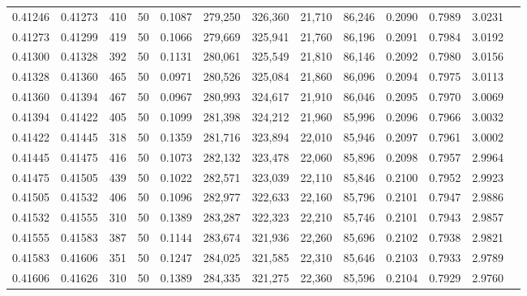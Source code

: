 \begin{tabular}{rrrrrrrrrrrrr}
0.41246 & 0.41273 &   410 &  50 &                                     0.1087 & 279,250 & 326,360 &  21,710 &  86,246 & 0.2090 & 0.7989 & 3.0231 \\
0.41273 & 0.41299 &   419 &  50 &                                     0.1066 & 279,669 & 325,941 &  21,760 &  86,196 & 0.2091 & 0.7984 & 3.0192 \\
0.41300 & 0.41328 &   392 &  50 &                                     0.1131 & 280,061 & 325,549 &  21,810 &  86,146 & 0.2092 & 0.7980 & 3.0156 \\
0.41328 & 0.41360 &   465 &  50 &                                     0.0971 & 280,526 & 325,084 &  21,860 &  86,096 & 0.2094 & 0.7975 & 3.0113 \\
0.41360 & 0.41394 &   467 &  50 &                                     0.0967 & 280,993 & 324,617 &  21,910 &  86,046 & 0.2095 & 0.7970 & 3.0069 \\
0.41394 & 0.41422 &   405 &  50 &                                     0.1099 & 281,398 & 324,212 &  21,960 &  85,996 & 0.2096 & 0.7966 & 3.0032 \\
0.41422 & 0.41445 &   318 &  50 &                                     0.1359 & 281,716 & 323,894 &  22,010 &  85,946 & 0.2097 & 0.7961 & 3.0002 \\
0.41445 & 0.41475 &   416 &  50 &                                     0.1073 & 282,132 & 323,478 &  22,060 &  85,896 & 0.2098 & 0.7957 & 2.9964 \\
0.41475 & 0.41505 &   439 &  50 &                                     0.1022 & 282,571 & 323,039 &  22,110 &  85,846 & 0.2100 & 0.7952 & 2.9923 \\
0.41505 & 0.41532 &   406 &  50 &                                     0.1096 & 282,977 & 322,633 &  22,160 &  85,796 & 0.2101 & 0.7947 & 2.9886 \\
0.41532 & 0.41555 &   310 &  50 &                                     0.1389 & 283,287 & 322,323 &  22,210 &  85,746 & 0.2101 & 0.7943 & 2.9857 \\
0.41555 & 0.41583 &   387 &  50 &                                     0.1144 & 283,674 & 321,936 &  22,260 &  85,696 & 0.2102 & 0.7938 & 2.9821 \\
0.41583 & 0.41606 &   351 &  50 &                                     0.1247 & 284,025 & 321,585 &  22,310 &  85,646 & 0.2103 & 0.7933 & 2.9789 \\
0.41606 & 0.41626 &   310 &  50 &                                     0.1389 & 284,335 & 321,275 &  22,360 &  85,596 & 0.2104 & 0.7929 & 2.9760 \\

\end{tabular}
